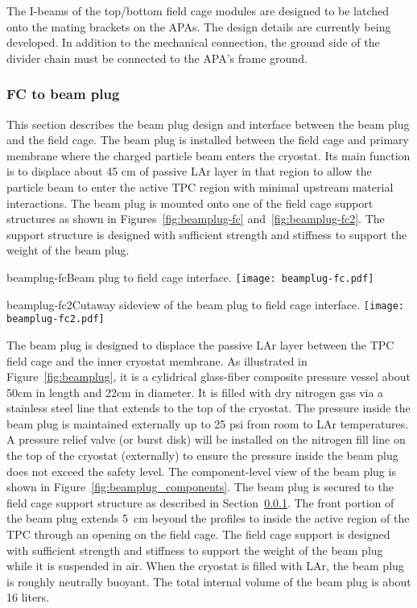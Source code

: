 The I-beams of the top/bottom field cage modules are designed to be latched onto the mating brackets on the APAs.  The design details are currently being developed.   
In addition to the mechanical connection, the ground side of the divider chain must be connected to the APA's frame ground. 


\subsubsection{FC to beam plug}
\label{subsec:fc-beamplug}
This section describes the beam plug design and interface between the beam plug and the field cage. The beam plug is installed between the field cage and primary membrane where the charged particle beam enters the cryostat. Its main function is to displace about 45 cm of passive LAr layer in that region to allow the particle beam to enter the active TPC region with minimal upstream material interactions. The beam plug is mounted onto one of the field cage support structures as shown in Figures~\ref{fig:beamplug-fc} and~\ref{fig:beamplug-fc2}. The support structure is designed with sufficient  strength and stiffness to support the weight of the beam plug.
\begin{cdrfigure}{beamplug-fc}{Beam plug to field cage interface.}
\texttt{[image: beamplug-fc.pdf]}
\end{cdrfigure}
\begin{cdrfigure}{beamplug-fc2}{Cutaway sideview of the beam plug to field cage interface.}
\texttt{[image: beamplug-fc2.pdf]}
\end{cdrfigure}

The beam plug is designed to displace the passive LAr layer between the TPC field cage and the inner cryostat membrane. As illustrated in Figure~\ref{fig:beamplug}, it is a cylidrical glass-fiber composite pressure vessel about 50cm in length and  22cm in diameter. It is filled with dry nitrogen gas via a stainless steel line that extends to the top of the cryostat. The pressure inside the beam plug is maintained externally up to 25 psi from room to LAr temperatures. A pressure relief valve (or burst disk) will be installed on the nitrogen fill line on the top of the cryostat (externally) to ensure the pressure inside the beam plug does not exceed the safety level. The component-level view of the beam plug is shown in Figure~\ref{fig:beamplug_components}.  The beam plug is secured to the field cage support structure as described in Section~\ref{subsec:fc-beamplug}. The front portion of the beam plug extends 5~cm beyond the profiles to inside the active region of the TPC through an opening on the field cage. The field cage support is designed with sufficient strength and stiffness to support the weight of the beam plug while it is suspended in air. 
When the cryostat is filled with LAr, the beam plug is roughly neutrally buoyant.  The total internal volume of the beam plug is about 16 liters. 

